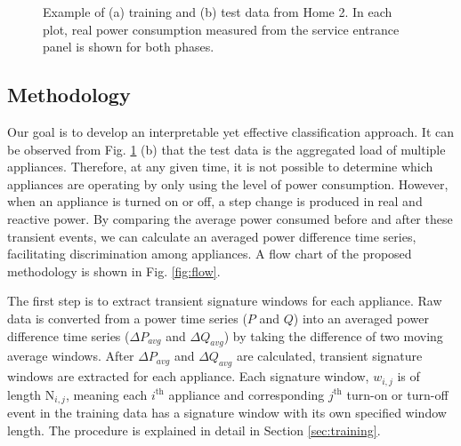 \documentclass[conference]{IEEEtran}
\begin{document}
\begin{figure}[!t]	
	\centering
	\hfil
	\caption{Example of (a) training and (b) test data from Home 2.  In each plot, real power consumption measured from the service entrance panel is shown for both phases. } 
	\label{fig:traintest}
\end{figure}



\subsection{Methodology}
Our goal is to develop an interpretable yet effective classification approach.  It can be observed from Fig. \ref{fig:traintest} (b) that the test data is the aggregated load of multiple appliances.  Therefore, at any given time, it is not possible to determine which appliances are operating by only using the level of power consumption.  However, when an appliance is turned on or off, a step change is produced in real and reactive power.  By comparing the average power consumed before and after these transient events, we can calculate an averaged power difference time series, facilitating discrimination among appliances. A flow chart of the proposed methodology is shown in Fig. \ref{fig:flow}.

The first step is to extract transient signature windows for each appliance.  Raw data is converted from a power time series ($P$ and $Q$) into an averaged power difference time series ($\Delta P_{avg}$ and $\Delta Q_{avg}$) by taking the difference of two moving average windows.  After $\Delta P_{avg}$ and $\Delta Q_{avg}$ are calculated, transient signature windows are extracted for each appliance.  Each signature window, $w_{i,j}$ is of length $\text{N}_{i,j}$, meaning each $i^{\text{th}}$ appliance and corresponding $j^{\text{th}}$ turn-on or turn-off event in the training data has a signature window with its own specified window length. The procedure is explained in detail in Section \ref{sec:training}. 
\end{document}
